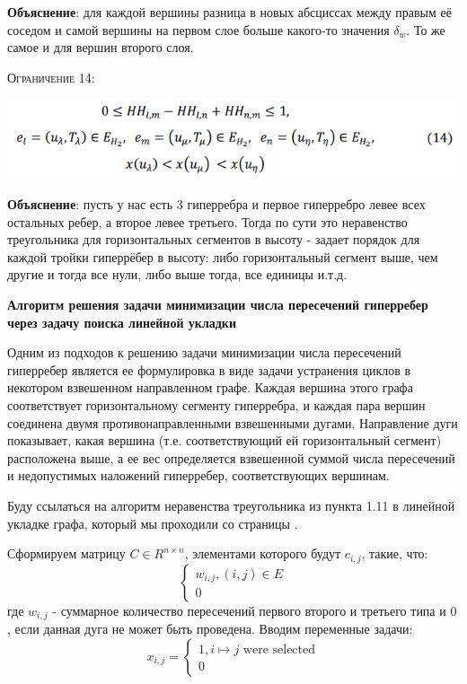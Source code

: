 \documentclass[%
10pt, %
final, %
oneside, %
onecolumn, %
centertags]{article} %
\theoremstyle{plain}
\theoremstyle{definition}
\theoremstyle{remark}
\begin{document}
\textbf{Объяснение}: для каждой вершины разница в новых абсциссах между правым её соседом и самой вершины на первом слое больше какого-то значения $\delta_w$. То же самое и для вершин второго слоя.

\textsc{Ограничение 14:}
\begin{center}
	\includegraphics[scale=0.6]{2.14.png}
\end{center}

\textbf{Объяснение}: пусть у нас есть $3$ гиперребра и первое гиперребро левее всех остальных ребер, а второе левее третьего. Тогда по сути это неравенство треугольника для горизонтальных сегментов в высоту - задает порядок для каждой тройки гиперрёбер в высоту: либо горизонтальный сегмент выше, чем другие и тогда все нули, либо выше тогда, все единицы и.т.д.


\textbf{Алгоритм решения задачи минимизации числа пересечений гиперребер через задачу поиска линейной укладки}

Одним из подходов к решению задачи минимизации числа пересечений гиперребер является ее формулировка в
виде задачи устранения циклов в некотором взвешенном направленном графе. Каждая вершина этого графа
соответствует горизонтальному сегменту гиперребра, и каждая пара вершин соединена двумя противонаправленными
взвешенными дугами. Направление дуги показывает, какая вершина (т.е. соответствующий ей горизонтальный
сегмент) расположена выше, а ее вес определяется взвешенной суммой числа пересечений и недопустимых наложений
гиперребер, соответствующих вершинам.

Буду ссылаться на алгоритм неравенства треугольника из пункта 1.11 в линейной укладке графа, который мы проходили со страницы \pageref{nerav}.

Сформируем матрицу $C \in R^{n \times n}$, элементами которого будут $c_{i, j}$, такие, что:
$$\begin{cases}
	w_{i,j}, (i,j) \in E \\
	0
\end{cases}$$
где $w_{i,j}$ - суммарное количество пересечений первого второго и третьего типа и $0$, если данная дуга не может быть проведена. Вводим переменные задачи:
$$x_{i,j} = \begin{cases}
	1, i \mapsto j \text{ were selected}\\
	0
\end{cases}$$
\end{document}
